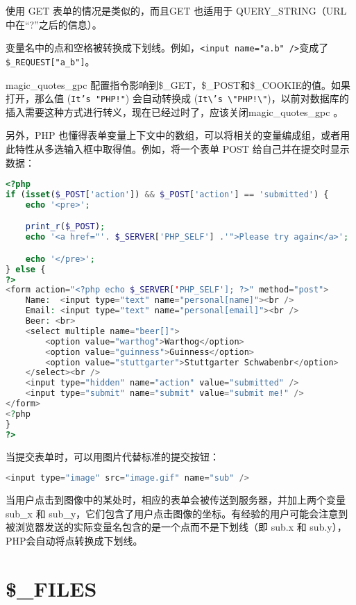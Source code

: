 使用 GET 表单的情况是类似的，而且GET 也适用于 QUERY\_STRING（URL 中在“?”之后的信息）。

变量名中的点和空格被转换成下划线。例如，\texttt{<input name="a.b" />}变成了\texttt{\$\_REQUEST["a\_b"]}。

magic\_quotes\_gpc 配置指令影响到\$\_GET，\$\_POST和\$\_COOKIE的值。如果打开，那么值 (\texttt{It's "PHP!"}) 会自动转换成 (\texttt{It\textbackslash 's \textbackslash "PHP!\textbackslash "})，以前对数据库的插入需要这种方式进行转义，现在已经过时了，应该关闭magic\_quotes\_gpc 。

另外，PHP 也懂得表单变量上下文中的数组，可以将相关的变量编成组，或者用此特性从多选输入框中取得值。例如，将一个表单 POST 给自己并在提交时显示数据：

\begin{lstlisting}[language=PHP]
<?php
if (isset($_POST['action']) && $_POST['action'] == 'submitted') {
    echo '<pre>';

    print_r($_POST);
    echo '<a href="'. $_SERVER['PHP_SELF'] .'">Please try again</a>';

    echo '</pre>';
} else {
?>
<form action="<?php echo $_SERVER['PHP_SELF']; ?>" method="post">
    Name:  <input type="text" name="personal[name]"><br />
    Email: <input type="text" name="personal[email]"><br />
    Beer: <br>
    <select multiple name="beer[]">
        <option value="warthog">Warthog</option>
        <option value="guinness">Guinness</option>
        <option value="stuttgarter">Stuttgarter Schwabenbr</option>
    </select><br />
    <input type="hidden" name="action" value="submitted" />
    <input type="submit" name="submit" value="submit me!" />
</form>
<?php
}
?>
\end{lstlisting}

当提交表单时，可以用图片代替标准的提交按钮：

\begin{lstlisting}[language=PHP]
<input type="image" src="image.gif" name="sub" />
\end{lstlisting}

当用户点击到图像中的某处时，相应的表单会被传送到服务器，并加上两个变量 sub\_x 和 sub\_y，它们包含了用户点击图像的坐标。有经验的用户可能会注意到被浏览器发送的实际变量名包含的是一个点而不是下划线（即 sub.x 和 sub.y），PHP会自动将点转换成下划线。


\section{\$\_FILES}

